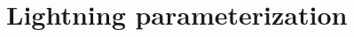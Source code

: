 \chapter{Lightning parameterization} \label{ch:lightning}

\ifpdf
    \graphicspath{{Chapter_lightning/figures/PNG/}{Chapter_lightning/figures/PDF/}{Chapter_lightning/figures/}}
\else
    \graphicspath{{Chapter_lightning/figures/EPS/}{Chapter_lightning/figures/}}
\fi